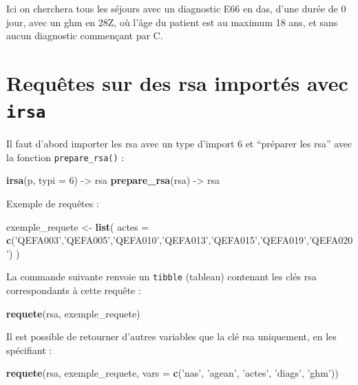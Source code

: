\documentclass[]{book}
\newenvironment{Shaded}{\begin{snugshade}}{\end{snugshade}}
\newcommand{\KeywordTok}[1]{\textcolor[rgb]{0.13,0.29,0.53}{\textbf{#1}}}
\newcommand{\DataTypeTok}[1]{\textcolor[rgb]{0.13,0.29,0.53}{#1}}
\newcommand{\DecValTok}[1]{\textcolor[rgb]{0.00,0.00,0.81}{#1}}
\newcommand{\StringTok}[1]{\textcolor[rgb]{0.31,0.60,0.02}{#1}}
\newcommand{\NormalTok}[1]{#1}
\begin{document}
Ici on cherchera tous les séjours avec un diagnostic E66 en das, d'une
durée de 0 jour, avec un ghm en 28Z, où l'âge du patient est au maximum
18 ans, et sans aucun diagnostic commençant par C.

\section{\texorpdfstring{Requêtes sur des rsa importés avec
\texttt{irsa}}{Requêtes sur des rsa importés avec irsa}}\label{requetes-sur-des-rsa-importes-avec-irsa}

Il faut d'abord importer les rsa avec un type d'import 6 et ``préparer
les rsa'' avec la fonction \texttt{prepare\_rsa()} :

\begin{Shaded}
\begin{Highlighting}[]
\KeywordTok{irsa}\NormalTok{(p, }\DataTypeTok{typi =} \DecValTok{6}\NormalTok{) ->}\StringTok{ }\NormalTok{rsa}
\KeywordTok{prepare_rsa}\NormalTok{(rsa) ->}\StringTok{ }\NormalTok{rsa}
\end{Highlighting}
\end{Shaded}

Exemple de requêtes :

\begin{Shaded}
\begin{Highlighting}[]
\NormalTok{exemple_requete <-}\StringTok{ }\KeywordTok{list}\NormalTok{(}
  \DataTypeTok{actes =} \KeywordTok{c}\NormalTok{(}\StringTok{'QEFA003'}\NormalTok{,}\StringTok{'QEFA005'}\NormalTok{,}\StringTok{'QEFA010'}\NormalTok{,}\StringTok{'QEFA013'}\NormalTok{,}\StringTok{'QEFA015'}\NormalTok{,}\StringTok{'QEFA019'}\NormalTok{,}\StringTok{'QEFA020'}\NormalTok{)}
\NormalTok{)}
\end{Highlighting}
\end{Shaded}

La commande suivante renvoie un \texttt{tibble} (tableau) contenant les
clés rsa correspondants à cette requête :

\begin{Shaded}
\begin{Highlighting}[]
\KeywordTok{requete}\NormalTok{(rsa, exemple_requete)}
\end{Highlighting}
\end{Shaded}

Il est possible de retourner d'autres variables que la clé rsa
uniquement, en les spécifiant :

\begin{Shaded}
\begin{Highlighting}[]
\KeywordTok{requete}\NormalTok{(rsa, exemple_requete, }\DataTypeTok{vars =} \KeywordTok{c}\NormalTok{(}\StringTok{'nas'}\NormalTok{, }\StringTok{'agean'}\NormalTok{, }\StringTok{'actes'}\NormalTok{, }\StringTok{'diags'}\NormalTok{, }\StringTok{'ghm'}\NormalTok{))}
\end{Highlighting}
\end{Shaded}
\end{document}
